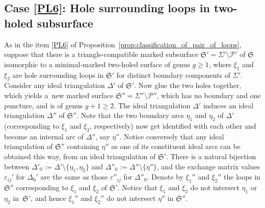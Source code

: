 \documentclass[pdftex]{sigma}
\numberwithin{equation}{section}
\theoremstyle{definition}
\begin{document}
\subsection{Case {\ref{PL6}}: Hole surrounding loops in two-holed subsurface}
As in the item \ref{PL6} of Proposition~\ref{prop:classification_of_pair_of_loops}, suppose that there is a triangle-compatible marked subsurface $\mathfrak{S}'=\Sigma'\setminus\mathcal{P}'$ of $\mathfrak{S}$ isomorphic to a minimal-marked two-holed surface of genus $g\ge 1$, where $\xi_1$ and $\xi_2$ are hole surrounding loops in $\mathfrak{S}'$ for distinct boundary components of $\Sigma'$.
Consider any ideal triangulation $\Delta'$ of $\mathfrak{S}'$. Now glue the two holes together, which yields a~new marked surface $\mathfrak{S}'' = \Sigma'' \setminus \mathcal{P}''$, which has no boundary and one puncture, and is of genus $g+1 \ge 2$. The ideal triangulation $\Delta'$ induces an ideal triangulation $\Delta''$ of $\mathfrak{S}''$. Note that the two boundary arcs $\eta_1$ and $\eta_2$ of $\Delta'$ (corresponding to $\xi_1$ and $\xi_2$, respectively) now get identified with each other and become an internal arc of $\Delta''$, say $\eta''$. Notice conversely that any ideal triangulation of $\mathfrak{S}''$ containing $\eta''$ as one of its constituent ideal arcs can be obtained this way, from an ideal triangulation of $\mathfrak{S}'$.
There is a natural bijection between $\Delta'_0 := \Delta' \setminus\{\eta_1,\eta_2\}$ and $\Delta''_0 := \Delta'' \setminus\{\eta''\}$, and the exchange matrix values $\varepsilon_{ij}'$ for $\Delta_0'$ are the same as those $\varepsilon''_{ij}$ for $\Delta''_0$. Denote by $\xi_1''$ and $\xi_2''$ the loops in $\mathfrak{S}''$ corresponding to $\xi_1$ and $\xi_2$ of $\mathfrak{S}'$. Notice that $\xi_1$ and $\xi_2$ do not intersect $\eta_1$ or $\eta_2$ in~$\mathfrak{S}'$, and hence $\xi_1''$ and $\xi_2''$ do not intersect $\eta''$ in $\mathfrak{S}''$.
\end{document}
